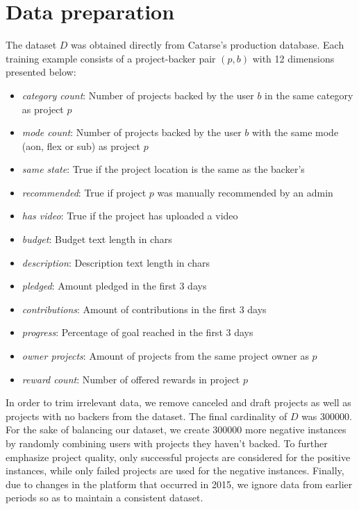 \documentclass[cic,tc,english]{iiufrgs}
\begin{document}
\section{Data preparation}
The dataset \(D\) was obtained directly from Catarse's production database. Each training example consists of a project-backer pair \((p,b)\) with 12 dimensions presented below:
\begin{itemize}

    \item \emph{category count}: Number of projects backed by the user \(b\) in the same category as project \(p\)
    \item \emph{mode count}: Number of projects backed by the user \(b\) with the same mode (aon, flex or sub) as project \(p\)
    \item \emph{same state}: True if the project location is the same as the backer's
    \item \emph{recommended}: True if project \(p\) was manually recommended by an admin
    \item \emph{has video}: True if the project has uploaded a video
    \item \emph{budget}: Budget text length in chars
    \item \emph{description}: Description text length in chars
    \item \emph{pledged}: Amount pledged in the first 3 days
    \item \emph{contributions}: Amount of contributions in the first 3 days
    \item \emph{progress}: Percentage of goal reached in the first 3 days
    \item \emph{owner projects}: Amount of projects from the same project owner as \(p\)
    \item \emph{reward count}: Number of offered rewards in project \(p\)
\end{itemize}

In order to trim irrelevant data, we remove canceled and draft projects as well as projects with no backers from the dataset. The final cardinality of \(D\) was 300000. For the sake of balancing our dataset, we create 300000 more negative instances by randomly combining users with projects they haven't backed. To further emphasize project quality, only successful projects are considered for the positive instances, while only failed projects are used for the negative instances. Finally, due to changes in the platform that occurred in 2015, we ignore data from earlier periods so as to maintain a consistent dataset.
\end{document}
